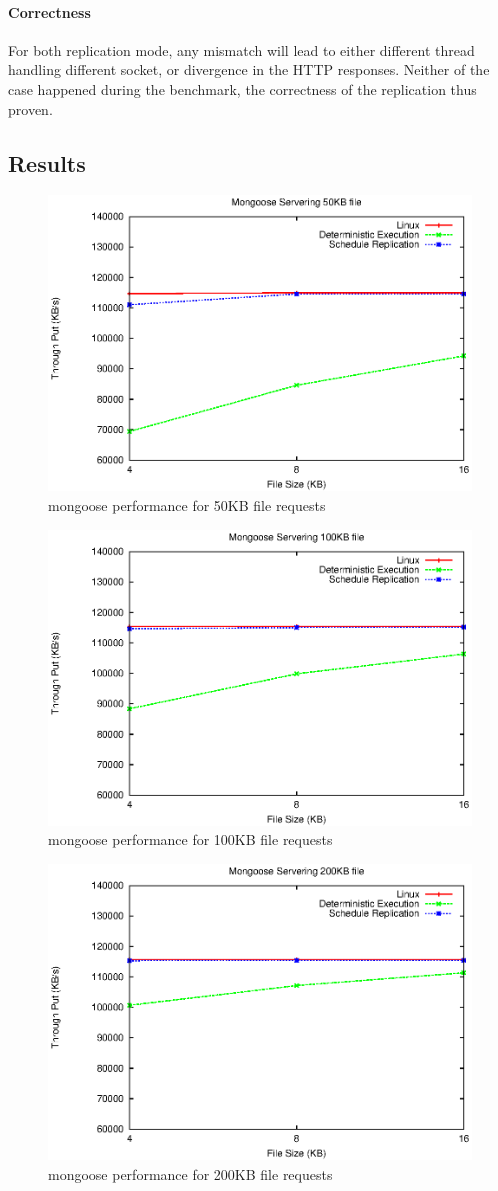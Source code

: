 \paragraph{Correctness} For both replication mode, any mismatch will lead to either different thread handling different socket, or divergence in the HTTP responses. Neither of the case happened during the benchmark, the correctness of the replication thus proven.

\subsection{Results}
\begin{figure}
\centering
\includegraphics[width=0.6\columnwidth]{figures/mg_throughput_50k}
\caption{mongoose performance for 50KB file requests}
\label{f:mg_50k}
\end{figure}
\begin{figure}
\centering
\includegraphics[width=0.6\columnwidth]{figures/mg_throughput_100k}
\caption{mongoose performance for 100KB file requests}
\label{f:mg_100k}
\end{figure}
\begin{figure}
\centering
\includegraphics[width=0.6\columnwidth]{figures/mg_throughput_200k}
\caption{mongoose performance for 200KB file requests}
\label{f:mg_200k}
\end{figure}


